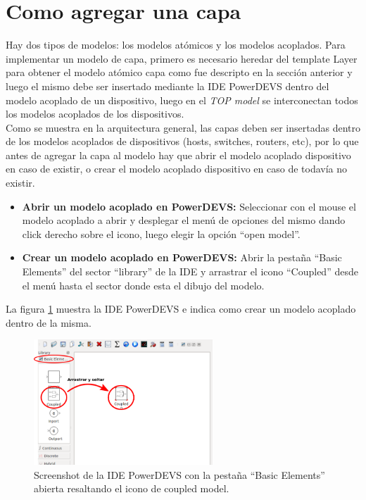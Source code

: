 \documentclass[10pt,a4paper]{article}
\begin{document}
\section{Como agregar una capa}

Hay dos tipos de modelos: los modelos atómicos y los modelos acoplados. Para implementar un modelo de capa, primero es necesario heredar del template Layer para obtener el modelo atómico capa como fue descripto en la sección anterior y luego el mismo debe ser insertado mediante la IDE PowerDEVS dentro del modelo acoplado de un dispositivo, luego en el \textit{TOP model} se interconectan todos los modelos acoplados de los dispositivos. \\

Como se muestra en la arquitectura general, las capas deben ser insertadas dentro de los modelos acoplados de dispositivos (hosts, switches, routers, etc), por lo que antes de agregar la capa al modelo hay que abrir el modelo acoplado dispositivo en caso de existir, o crear el modelo acoplado dispositivo en caso de todavía no existir.

\begin{itemize}
\item \textbf{Abrir un modelo acoplado en PowerDEVS:} Seleccionar con el mouse el modelo acoplado a abrir y desplegar el menú de opciones del mismo dando click derecho sobre el icono, luego elegir la opción ``open model''.
\item \textbf{Crear un modelo acoplado en PowerDEVS: } Abrir la pestaña ``Basic Elements'' del sector ``library'' de la IDE y arrastrar el icono ``Coupled'' desde el menú hasta el sector donde esta el dibujo del modelo.
\end{itemize}

La figura \ref{figure: PowerDEVS IDE} muestra la IDE PowerDEVS e indica como crear un modelo acoplado dentro de la misma. \\

\begin{figure}[htbp]
    \centering
    \includegraphics[width = 0.6\textwidth]{img/png/powerDEVS_coupled.png}
    \caption{Screenshot de la IDE PowerDEVS con la pestaña ``Basic Elements'' abierta resaltando el icono de coupled model.}
    \label{figure: PowerDEVS IDE}
\end{figure}
\end{document}
